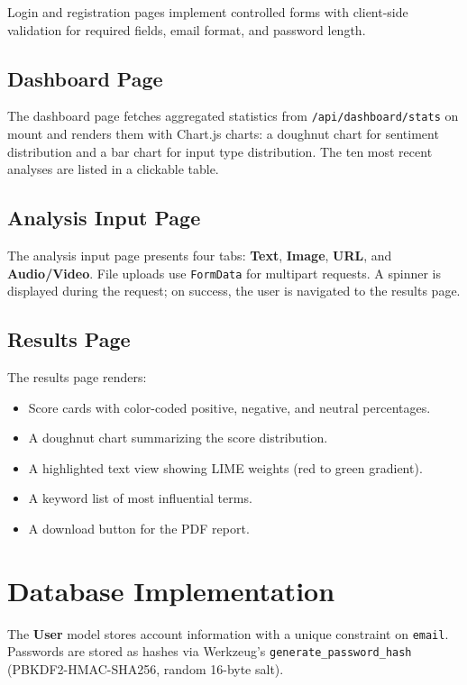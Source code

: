 \documentclass[12pt, a4paper]{report}
\begin{document}
Login and registration pages implement controlled forms with client-side validation for required fields, email format, and password length.

\subsection{Dashboard Page}

The dashboard page fetches aggregated statistics from \texttt{/api/dashboard/stats} on mount and renders them with Chart.js charts: a doughnut chart for sentiment distribution and a bar chart for input type distribution. The ten most recent analyses are listed in a clickable table.

\subsection{Analysis Input Page}

The analysis input page presents four tabs: \textbf{Text}, \textbf{Image}, \textbf{URL}, and \textbf{Audio/Video}. File uploads use \texttt{FormData} for multipart requests. A spinner is displayed during the request; on success, the user is navigated to the results page.

\subsection{Results Page}

The results page renders:

\begin{itemize}[noitemsep, leftmargin=1.5em]
    \item Score cards with color-coded positive, negative, and neutral percentages.
    \item A doughnut chart summarizing the score distribution.
    \item A highlighted text view showing LIME weights (red to green gradient).
    \item A keyword list of most influential terms.
    \item A download button for the PDF report.
\end{itemize}

\section{Database Implementation}

The \textbf{User} model stores account information with a unique constraint on \texttt{email}. Passwords are stored as hashes via Werkzeug's \texttt{generate\_password\_hash} (PBKDF2-HMAC-SHA256, random 16-byte salt).
\end{document}
